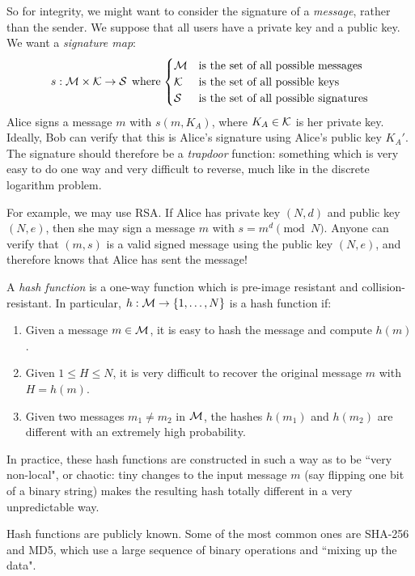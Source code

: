 \documentclass{article}
\begin{document}
So for integrity, we might want to consider the signature of a \textit{message}, rather than the sender. We suppose that all users have a private key and a public key. We want a \textit{signature map}:
\[
s : \mathcal{M} \times \mathcal{K} \to \mathcal{S}
\mathrel{\, \text{where}} \begin{cases}
	\mathcal{M} & \text{is the set of all possible messages} \\
	\mathcal{K} & \text{is the set of all possible keys} \\
	\mathcal{S} & \text{is the set of all possible signatures} \\
\end{cases}
\]
Alice signs a message $m$ with $s(m, K_A)$, where $K_A \in \mathcal{K}$ is her private key. Ideally, Bob can verify that this is Alice's signature using Alice's public key $K_A'$. The signature should therefore be a \textit{trapdoor} function: something which is very easy to do one way and very difficult to reverse, much like in the discrete logarithm problem.

For example, we may use RSA. If Alice has private key $(N, d)$ and public key $(N, e)$, then she may sign a message $m$ with $s = m^d \pmod N$. Anyone can verify that $(m, s)$ is a valid signed message using the public key $(N, e)$, and therefore knows that Alice has sent the message!

\begin{definition}
    A \textit{hash function} is a one-way function which is pre-image resistant and collision-resistant. In particular, $h : \mathcal{M} \to \left\lbrace 1, \dots, N \right\rbrace$ is a hash function if:
    \begin{enumerate}
	    \item Given a message $m \in \mathcal{M}$, it is easy to hash the message and compute $h(m)$.
	    \item Given $1 \leq H \leq N$, it is very difficult to recover the original message $m$ with $H = h(m)$.
	    \item Given two messages $m_1 \neq m_2$ in $\mathcal{M}$, the hashes $h(m_1)$ and $h(m_2)$ are different with an extremely high probability.
	\end{enumerate}
	In practice, these hash functions are constructed in such a way as to be ``very non-local", or chaotic: tiny changes to the input message $m$ (say flipping one bit of a binary string) makes the resulting hash totally different in a very unpredictable way.
	
	Hash functions are publicly known. Some of the most common ones are SHA-256 and MD5, which use a large sequence of binary operations and ``mixing up the data".
\end{definition}
\end{document}
